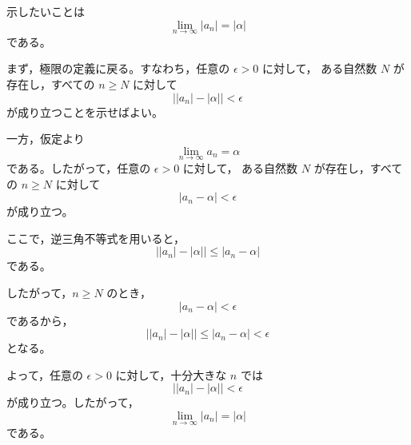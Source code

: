 \begin{strategy}
	示したいことは
	\[
		\lim_{n\to\infty}|a_n|=|\alpha|
	\]
	である。

	まず，極限の定義に戻る。すなわち，任意の $\epsilon>0$ に対して，
	ある自然数 $N$ が存在し，すべての $n\geq N$ に対して
	\[
		\bigl||a_n|-|\alpha|\bigr|<\epsilon
	\]
	が成り立つことを示せばよい。

	一方，仮定より
	\[
		\lim_{n\to\infty}a_n=\alpha
	\]
	である。したがって，任意の $\epsilon>0$ に対して，
	ある自然数 $N$ が存在し，すべての $n\geq N$ に対して
	\[
		|a_n-\alpha|<\epsilon
	\]
	が成り立つ。

	ここで，逆三角不等式を用いると，
	\[
		\bigl||a_n|-|\alpha|\bigr|
		\leq |a_n-\alpha|
	\]
	である。

	したがって，$n\geq N$ のとき，
	\[
		|a_n-\alpha|<\epsilon
	\]
	であるから，
	\[
		\bigl||a_n|-|\alpha|\bigr|
		\leq |a_n-\alpha|
		<\epsilon
	\]
	となる。

	よって，任意の $\epsilon>0$ に対して，十分大きな $n$ では
	\[
		\bigl||a_n|-|\alpha|\bigr|<\epsilon
	\]
	が成り立つ。したがって，
	\[
		\lim_{n\to\infty}|a_n|=|\alpha|
	\]
	である。
\end{strategy}